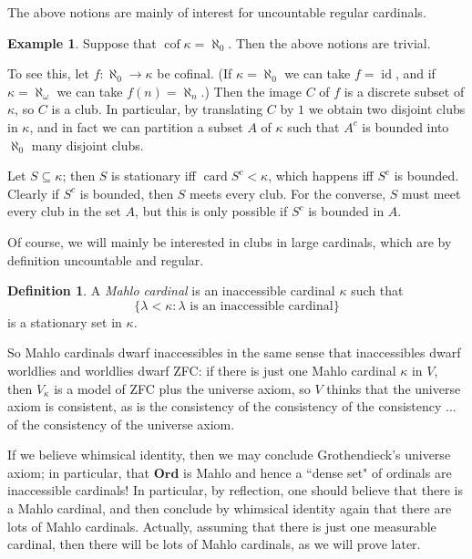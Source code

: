 \documentclass[12pt]{report}
\newcommand{\card}{\operatorname{card}}
\newcommand{\id}{\operatorname{id}}
\newcommand{\Ord}{\mathbf{Ord}}
\DeclareMathOperator{\cof}{cof}
\newcommand{\dfn}[1]{\emph{#1}\index{#1}}
\theoremstyle{definition}
\newtheorem{definition}[theorem]{Definition}
\newtheorem{example}[theorem]{Example}
\begin{document}
The above notions are mainly of interest for uncountable regular cardinals.
\begin{example}
Suppose that $\cof \kappa = \aleph_0$. Then the above notions are trivial.

To see this, let $f: \aleph_0 \to \kappa$ be cofinal.
(If $\kappa = \aleph_0$ we can take $f = \id$, and if $\kappa = \aleph_\omega$ we can take $f(n) = \aleph_n$.)
Then the image $C$ of $f$ is a discrete subset of $\kappa$, so $C$ is a club. In particular, by translating $C$ by $1$ we obtain two disjoint clubs in $\kappa$, and in fact we can partition a subset $A$ of $\kappa$ such that $A^c$ is bounded into $\aleph_0$ many disjoint clubs.

Let $S \subseteq \kappa$; then $S$ is stationary iff $\card S^c < \kappa$, which happens iff $S^c$ is bounded.
Clearly if $S^c$ is bounded, then $S$ meets every club.
For the converse, $S$ must meet every club in the set $A$, but this is only possible if $S^c$ is bounded in $A$.
\end{example}
Of course, we will mainly be interested in clubs in large cardinals, which are by definition uncountable and regular.

\begin{definition}
A \dfn{Mahlo cardinal} is an inaccessible cardinal $\kappa$ such that
$$\{\lambda < \kappa: \lambda \text{ is an inaccessible cardinal}\}$$
is a stationary set in $\kappa$.
\end{definition}
So Mahlo cardinals dwarf inaccessibles in the same sense that inaccessibles dwarf worldlies and worldlies dwarf ZFC:
if there is just one Mahlo cardinal $\kappa$ in $V$, then $V_\kappa$ is a model of ZFC plus the universe axiom, so $V$ thinks that the universe axiom is consistent, as is the consistency of the consistency of the consistency ... of the consistency of the universe axiom.

If we believe whimsical identity, then we may conclude Grothendieck's universe axiom; in particular, that $\Ord$ is Mahlo and hence a ``dense set" of ordinals are inaccessible cardinals!
In particular, by reflection, one should believe that there is a Mahlo cardinal, and then conclude by whimsical identity again that there are lots of Mahlo cardinals.
Actually, assuming that there is just one measurable cardinal, then there will be lots of Mahlo cardinals, as we will prove later.
\end{document}
